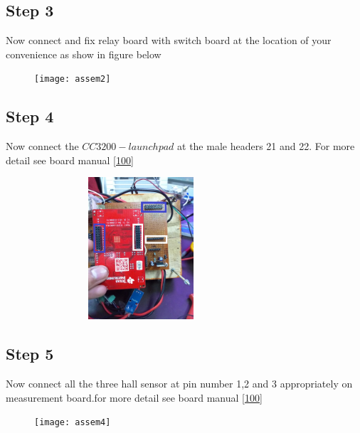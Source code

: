 \documentclass[a4paper,12pt,oneside]{book}
\begin{document}
\subsection*{Step 3}
Now connect and fix relay board with switch board at the location of your convenience as show in figure below
\begin{figure}[h]
	\texttt{[image: assem2]}
\end{figure}
\newpage
\subsection*{Step 4}
Now connect the $CC3200-launchpad$ at the male headers 21 and 22. For more detail see board manual \autoref{100}
\begin{figure}[h]
	\includegraphics[width=300px,height=200px]{assem3}
\end{figure}
\subsection*{Step 5}
Now connect all the three hall sensor at pin number 1,2 and 3 appropriately on measurement board.for more detail see board manual \autoref{100}
\begin{figure}[h]
	\texttt{[image: assem4]}
\end{figure}
\end{document}
